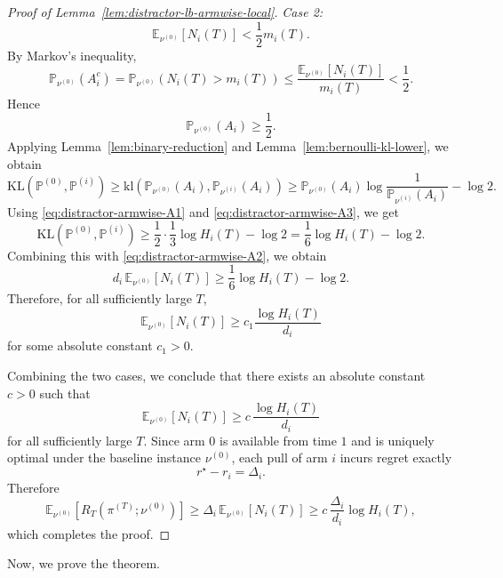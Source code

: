 \documentclass[
  12pt]{article}
\begin{document}
\begin{proof}[Proof of Lemma~\ref{lem:distractor-lb-armwise-local}]
\medskip
\noindent
\textit{Case 2:}
\[
\mathbb E_{\nu^{(0)}}[N_i(T)]< \frac12 m_i(T).
\]
By Markov's inequality,
\[
\mathbb P_{\nu^{(0)}}(A_i^c)
=
\mathbb P_{\nu^{(0)}}(N_i(T)>m_i(T))
\le
\frac{\mathbb E_{\nu^{(0)}}[N_i(T)]}{m_i(T)}
<
\frac12.
\]
Hence
\begin{equation}
\mathbb P_{\nu^{(0)}}(A_i)\ge \frac12.
\label{eq:distractor-armwise-A3}
\end{equation}
Applying Lemma~\ref{lem:binary-reduction} and
Lemma~\ref{lem:bernoulli-kl-lower}, we obtain
\[
\mathrm{KL}(\mathbb P^{(0)},\mathbb P^{(i)})
\ge
\mathrm{kl}\left(\mathbb P_{\nu^{(0)}}(A_i),\mathbb P_{\nu^{(i)}}(A_i)\right)
\ge
\mathbb P_{\nu^{(0)}}(A_i)\log\frac{1}{\mathbb P_{\nu^{(i)}}(A_i)}-\log 2.
\]
Using \eqref{eq:distractor-armwise-A1} and \eqref{eq:distractor-armwise-A3}, we
get
\[
\mathrm{KL}(\mathbb P^{(0)},\mathbb P^{(i)})
\ge
\frac12\cdot \frac13\log H_i(T)-\log 2
=
\frac16\log H_i(T)-\log 2.
\]
Combining this with \eqref{eq:distractor-armwise-A2}, we obtain
\[
d_i\,\mathbb E_{\nu^{(0)}}[N_i(T)]
\ge
\frac16\log H_i(T)-\log 2.
\]
Therefore, for all sufficiently large $T$,
\[
\mathbb E_{\nu^{(0)}}[N_i(T)]
\ge
c_1\frac{\log H_i(T)}{d_i}
\]
for some absolute constant $c_1>0$.

\medskip

Combining the two cases, we conclude that there exists an absolute constant
$c>0$ such that
\[
\mathbb E_{\nu^{(0)}}[N_i(T)]
\ge
c\,\frac{\log H_i(T)}{d_i}
\]
for all sufficiently large $T$. Since arm $0$ is available from time $1$ and is uniquely optimal under the
baseline instance $\nu^{(0)}$, each pull of arm $i$ incurs regret exactly
\[
r^\star-r_i=\Delta_i.
\]
Therefore
\[
\mathbb E_{\nu^{(0)}}[R_T(\pi^{(T)};\nu^{(0)})]
\ge
\Delta_i\,\mathbb E_{\nu^{(0)}}[N_i(T)]
\ge
c\,\frac{\Delta_i}{d_i}\log H_i(T),
\]
which completes the proof.
\end{proof}

Now, we prove the theorem.
\end{document}
